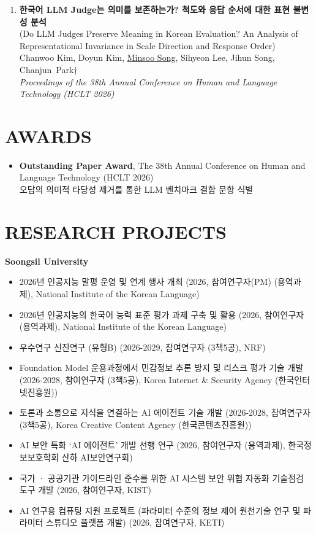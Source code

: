 \documentclass[10pt,a4paper]{article}
\newcommand{\krfont}{}           %
\newcommand{\kr}[1]{{\krfont #1}}
\let\krfont\notoserifkr
\newcommand{\seclabel}[1]{\section*{\uppercase{#1}}}
\begin{document}
\begin{enumerate}
    \item \small{\textbf{\kr{한국어 LLM Judge는 의미를 보존하는가? 척도와 응답 순서에 대한 표현 불변성 분석}} \\
    (Do LLM Judges Preserve Meaning in Korean Evaluation? An Analysis of Representational Invariance in Scale Direction and Response Order) \\
    Chanwoo Kim, Doyun Kim, \underline{Minsoo Song}, Sihyeon Lee, Jihun Song, \mbox{Chanjun Park$\dagger$} \\
    \textit{Proceedings of the 38th Annual Conference on Human and Language Technology (HCLT 2026)}}
\end{enumerate}

\newpage

\seclabel{Awards}
\begin{itemize}
    \item \small{\textbf{Outstanding Paper Award}, The 38th Annual Conference on Human and Language Technology (HCLT 2026) \\
    \kr{오답의 의미적 타당성 제거를 통한 LLM 벤치마크 결함 문항 식별}}
\end{itemize}

\seclabel{Research Projects}
\textbf{Soongsil University}
\begin{itemize}
    \item \small{\kr{2026년 인공지능 말평 운영 및 연계 행사 개최 (2026, 참여연구자(PM) (용역과제), National Institute of the Korean Language)}}
    \item \small{\kr{2026년 인공지능의 한국어 능력 표준 평가 과제 구축 및 활용 (2026, 참여연구자 (용역과제), National Institute of the Korean Language)}}
    \item \small{\kr{우수연구 신진연구 (유형B) (2026-2029, 참여연구자 (3책5공), NRF)}}
    \item \small{\kr{Foundation Model 운용과정에서 민감정보 추론 방지 및 리스크 평가 기술 개발 (2026-2028, 참여연구자 (3책5공), Korea Internet \& Security Agency (한국인터넷진흥원))}}
    \item \small{\kr{토론과 소통으로 지식을 연결하는 AI 에이전트 기술 개발 (2026-2028, 참여연구자 (3책5공), Korea Creative Content Agency (한국콘텐츠진흥원))}}
    \item \small{\kr{AI 보안 특화 ‘AI 에이전트’ 개발 선행 연구 (2026, 참여연구자 (용역과제), 한국정보보호학회 산하 AI보안연구회)}}
    \item \small{\kr{국가 · 공공기관 가이드라인 준수를 위한 AI 시스템 보안 위협 자동화 기술점검 도구 개발 (2026, 참여연구자, KIST)}}
    \item \small{\kr{AI 연구용 컴퓨팅 지원 프로젝트 (파라미터 수준의 정보 제어 원천기술 연구 및 파라미터 스튜디오 플랫폼 개발) (2026, 참여연구자, KETI)}}
\end{itemize}
\end{document}
